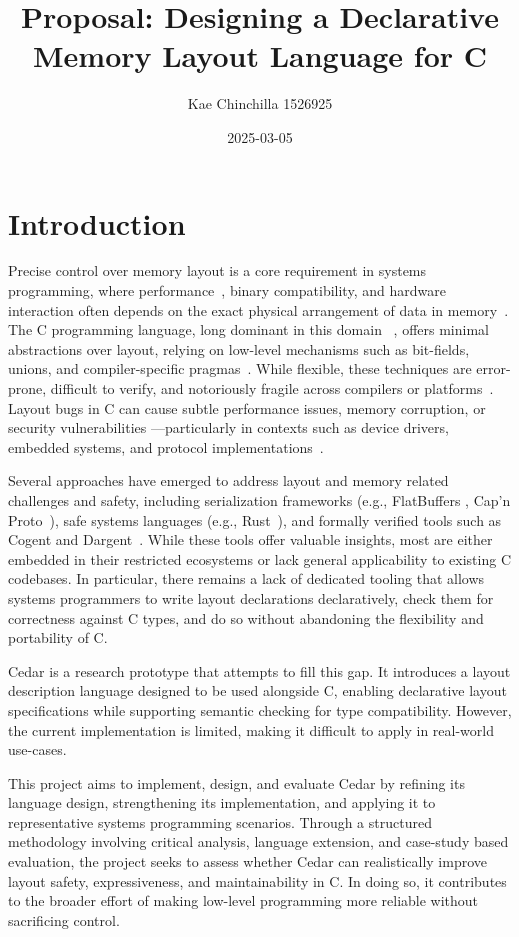 \documentclass[12pt]{article}
\author{Kae Chinchilla 1526925}
\title{Proposal: Designing a Declarative Memory Layout Language for C}
\date{2025-03-05}
\begin{document}
\maketitle
\section{Introduction}
Precise control over memory layout is a core requirement in systems programming,
where performance~\autocite{adt_layout_faria}, binary compatibility, and hardware interaction often 
depends on the exact physical arrangement of data in memory~\autocite{device_driver_verification}. 
The C programming
language, long dominant in this domain~\autocite{dist_systems_languages,C_embedded_programming}
, offers minimal abstractions over layout,
relying on low-level mechanisms such as bit-fields, unions,
\autocite{C_union_bugs} and compiler-specific
pragmas~\autocite{pragmas_jungck}. While flexible, these techniques are error-prone, difficult to verify,
and notoriously fragile across compilers or platforms~\autocite{memory_errors_stridharan}. Layout bugs in C can
cause subtle performance issues, memory corruption, or security vulnerabilities
---particularly in contexts such as device drivers, embedded systems, and 
protocol implementations~\autocite{evaluation_memory_errors,C_errors_study}.

Several approaches have emerged to address layout and memory related challenges
and safety, including serialization frameworks (e.g., FlatBuffers
\autocite{flat_buffers}, Cap'n Proto~\autocite{capn_proto_serialization}),
safe systems languages (e.g., Rust~\autocite{rust_memory_v_c,rust_memory_protection}),
 and formally verified tools such as
Cogent and Dargent~\autocite{dargent}. While these tools offer valuable insights, most are either
embedded in their restricted ecosystems or lack general applicability to
existing C codebases. In particular, there remains a lack of dedicated
tooling that allows systems programmers to write layout declarations
declaratively, check them for correctness against C types, and do so without
abandoning the flexibility and portability of C.

Cedar is a research prototype that attempts to fill this gap. It introduces a 
layout description language designed to be used alongside C, enabling
declarative layout specifications while supporting semantic checking for type
compatibility. However, the current implementation is limited, making it difficult
to apply in real-world use-cases.

This project aims to implement, design, and evaluate Cedar by refining its language design, 
strengthening its implementation, and applying it to representative systems
programming scenarios. Through a structured methodology involving critical
analysis, language extension, and case-study based evaluation, the project seeks
to assess whether Cedar can realistically improve layout safety, expressiveness,
and maintainability in C. In doing so, it contributes to the broader effort of
making low-level programming more reliable without sacrificing control.
\end{document}
